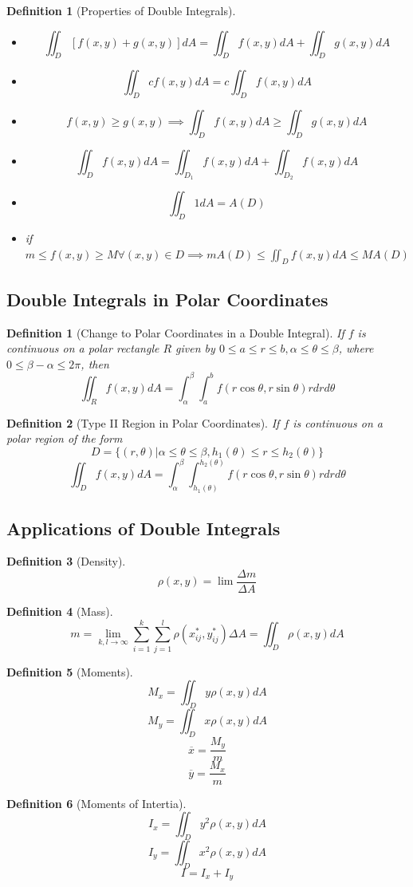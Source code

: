 \documentclass[10pt]{report}
\newtheorem{def2}{Definition}[section]
\newtheorem{def3}{Definition}[subsection]
\begin{document}
\begin{def2}[Properties of Double Integrals]
\begin{itemize}
\item[(i)] $$\iint_D [f(x,y) + g(x,y)]dA = \iint_D f(x,y)dA + \iint_D g(x,y)dA$$
\item[(ii)] $$\iint_D cf(x,y)dA = c\iint_D f(x,y)dA$$
\item[(iii)] $$f(x,y) \geq g(x,y) \implies \iint_D f(x,y)dA \geq \iint_D g(x,y)dA$$
\item[(iv)] $$\iint_D f(x,y)dA = \iint_{D_1} f(x,y)dA + \iint_{D_2} f(x,y)dA$$
\item[(v)] $$\iint_D 1dA = A(D)$$
\item[(vi)] if $m\leq f(x,y) \geq M \forall (x,y) \in D \implies mA(D)\leq \iint_D f(x,y)dA \leq MA(D)$
\end{itemize}
\end{def2}

\subsection{Double Integrals in Polar Coordinates}
\begin{def3}[Change to Polar Coordinates in a Double Integral]
If $f$ is continuous on a polar rectangle $R$ given by $0\leq a \leq r \leq b, \alpha\leq\theta\leq\beta$, where $0\leq \beta- \alpha \leq 2\pi$, then
$$\iint_R f(x,y)dA = \int_\alpha^\beta \int_a^b f(r\cos\theta, r\sin\theta)rdrd\theta$$
\end{def3}
\begin{def3}[Type II Region in Polar Coordinates]
If $f$ is continuous on a polar region of the form
$$D = \{ (r,\theta)| \alpha\leq\theta\leq\beta, h_1(\theta) \leq r \leq h_2(\theta)\}$$
$$\iint_D f(x,y)dA = \int_\alpha^\beta \int_{h_1(\theta)}^{h_2(\theta)}f(r\cos\theta,r\sin\theta)rdrd\theta$$
\end{def3}

\subsection{Applications of Double Integrals}
\begin{def3}[Density]
$$\rho(x,y) = \lim\frac{\Delta m}{\Delta A}$$
\end{def3}
\begin{def3}[Mass]
$$m=\lim_{k,l\to \infty}\sum_{i=1}^k\sum_{j=1}^l\rho(x_{ij}^*,y_{ij}^*)\Delta A = \iint_D \rho(x,y)dA$$
\end{def3}
\begin{def3}[Moments]
$$M_x = \iint_D y\rho(x,y)dA$$
$$M_y = \iint_D x\rho(x,y)dA$$
$$\overline{x} = \frac{M_y}{m}$$
$$\overline{y} = \frac{M_x}{m}$$
\end{def3}
\begin{def3}[Moments of Intertia]
$$I_x = \iint_D y^2\rho(x,y)dA$$
$$I_y = \iint_D x^2\rho(x,y)dA$$
$$I = I_x + I_y$$
\end{def3}
\end{document}
